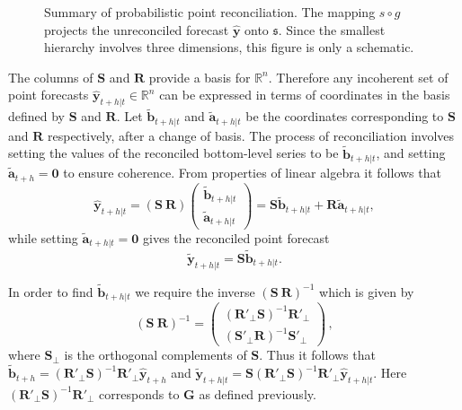 \documentclass[a4paper, 11pt]{article}
\theoremstyle{definition}
\begin{document}
\begin{figure}
	
	\caption{Summary of probabilistic point reconciliation. The mapping $s\circ g$ projects the unreconciled forecast $\hat{\bm{y}}$ onto $\mathfrak{s}$. Since the smallest hierarchy involves three dimensions, this figure is only a schematic.}\label{fig:pointfr_sch}
\end{figure}

The columns of $\bm{S}$ and $\bm{R}$ provide a basis for $\mathbb{R}^n$. Therefore any incoherent set of point forecasts $\hat{\bm{y}}_{t+h|t} \in \mathbb{R}^n$ can be expressed in terms of coordinates in the basis defined by $\bm{S}$ and $\bm{R}$. Let $\tilde{\bm{b}}_{t+h|t}$ and $\tilde{\bm{a}}_{t+h|t}$ be the coordinates corresponding to $\bm{S}$ and $\bm{R}$ respectively, after a change of basis. The process of reconciliation involves setting the values of the reconciled bottom-level series to be $\tilde{\bm{b}}_{t+h|t}$, and setting $\tilde{\bm{a}}_{t+h}=\bm{0}$ to ensure coherence. From properties of linear algebra it follows that
\[
  \hat{\bm{y}}_{t+h|t} = (\bm{S} ~ \bm{R})
  \begin{pmatrix}
  \tilde{\bm{b}}_{t+h|t}\\ \tilde{\bm{a}}_{t+h|t}
  \end{pmatrix}= \bm{S}\tilde{\bm{b}}_{t+h|t} + \bm{R}\tilde{\bm{a}}_{t+h|t},
\]
while setting $\tilde{\bm{a}}_{t+h|t}=\bm{0}$ gives the reconciled point forecast
\[
  \tilde{\bm{y}}_{t+h|t} = \bm{S}\tilde{\bm{b}}_{t+h|t}.
\]


In order to find $\tilde{\bm{b}}_{t+h|t}$ we require the inverse $(\bm{S} ~ \bm{R})^{-1}$ which is given by
\begin{equation}
(\bm{S} ~ \bm{R})^{-1} = \begin{pmatrix}
(\bm{R}'_\bot \bm{S})^{-1}\bm{R}'_\bot \\ (\bm{S}'_\bot \bm{R})^{-1}\bm{S}'_\bot
\end{pmatrix}\,,
\end{equation}
where $\bm{S}_{\bot}$ is the orthogonal complements of $\bm{S}$. Thus it follows that $\tilde{\bm{b}}_{t+h}=(\bm{R}'_\bot \bm{S})^{-1}\bm{R}'_\bot \hat{\bm{y}}_{t+h}$ and $\tilde{\bm{y}}_{t+h|t}=\bm{S}(\bm{R}'_\bot \bm{S})^{-1}\bm{R}'_\bot \hat{\bm{y}}_{t+h|t}$. Here $(\bm{R}'_\bot \bm{S})^{-1}\bm{R}'_\bot$ corresponds to $\bm{G}$ as defined previously.
\end{document}
